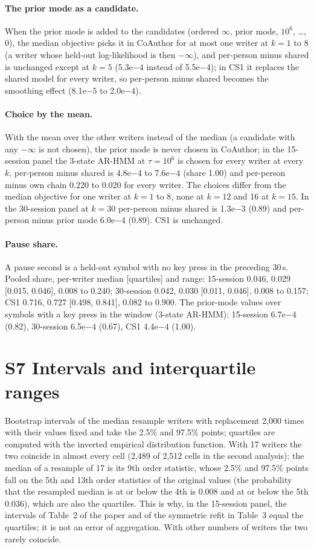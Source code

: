 \documentclass[10pt]{article}
\newcommand{\e}[2]{#1e$#2$}
\newcommand{\arthree}{\mbox{3-state} \mbox{AR-HMM}}
\newcommand{\Ssec}[2]{\section*{S#1\texorpdfstring{\quad}{ } #2}\addcontentsline{toc}{section}{S#1\texorpdfstring{\quad}{ } #2}\label{S#1}}
\begin{document}
\paragraph{The prior mode as a candidate.} When the prior mode is added to the candidates (ordered $\infty$, prior mode, $10^6$, \dots, 0), the median objective picks it in CoAuthor for at most one writer at $k=1$ to 8 (a writer whose held-out log-likelihood is then $-\infty$), and per-person minus shared is unchanged except at $k=5$ (\e{5.3}{-4} instead of \e{5.5}{-4}); in CS1 it replaces the shared model for every writer, so per-person minus shared becomes the smoothing effect (\e{8.1}{-5} to \e{2.0}{-4}).

\paragraph{Choice by the mean.} With the mean over the other writers instead of the median (a candidate with any $-\infty$ is not chosen), the prior mode is never chosen in CoAuthor; in the 15-session panel the \arthree{} at $\tau=10^6$ is chosen for every writer at every $k$, per-person minus shared is \e{4.8}{-4} to \e{7.6}{-4} (share 1.00) and per-person minus own chain 0.220 to 0.020 for every writer. The choices differ from the median objective for one writer at $k=1$ to 8, none at $k=12$ and 16 at $k=15$. In the 30-session panel at $k=30$ per-person minus shared is \e{1.3}{-3} (0.89) and per-person minus prior mode \e{6.0}{-4} (0.89). CS1 is unchanged.

\paragraph{Pause share.} A pause second is a held-out symbol with no key press in the preceding 30\,s. Pooled share, per-writer median [quartiles] and range: 15-session 0.046, 0.029 [0.015, 0.046], 0.008 to 0.240; 30-session 0.042, 0.030 [0.011, 0.046], 0.008 to 0.157; CS1 0.716, 0.727 [0.498, 0.841], 0.082 to 0.900. The prior-mode values over symbols with a key press in the window (\arthree{}): 15-session \e{6.7}{-4} (0.82), 30-session \e{6.5}{-4} (0.67), CS1 \e{4.4}{-4} (1.00).

\Ssec{7}{Intervals and interquartile ranges}

Bootstrap intervals of the median resample writers with replacement 2,000 times with their values fixed and take the 2.5\% and 97.5\% points; quartiles are computed with the inverted empirical distribution function. With 17 writers the two coincide in almost every cell (2,489 of 2,512 cells in the second analysis): the median of a resample of 17 is its 9th order statistic, whose 2.5\% and 97.5\% points fall on the 5th and 13th order statistics of the original values (the probability that the resampled median is at or below the 4th is 0.008 and at or below the 5th 0.036), which are also the quartiles. This is why, in the 15-session panel, the intervals of Table~2 of the paper and of the symmetric refit in Table~3 equal the quartiles; it is not an error of aggregation. With other numbers of writers the two rarely coincide.
\end{document}
